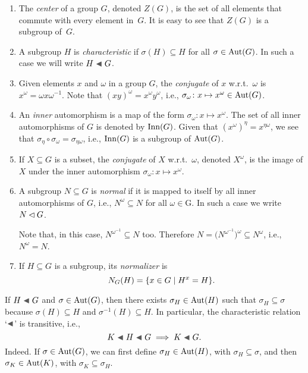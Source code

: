 \begin{defns}${}$
    \begin{enumerate}[\rm i)]
        \item     The \textsl{center} of a group $G$, denoted $Z(G)$, is the set of all elements that commute with every element in~$G$. It is easy to see that $Z(G)$ is a subgroup of~$G$.

        \item A subgroup $H$ is \textsl{characteristic} if $\sigma(H)\subseteq H$ for all $\sigma\in{\rm Aut}(G)$. In such a case we will write $H \ch G$.
        
        \item Given elements $x$ and\/ $\omega$ in a group $G$, the \textsl{conjugate} of $x$ w.r.t.\ $\omega$ is $x^\omega=\omega x\omega^{-1}$. Note that $(xy)^\omega=x^\omega y^\omega$, i.e., $\sigma_\omega\colon x\mapsto x^\omega\in{\rm Aut}(G)$.

        \item An \textsl{inner} automorphism is a map of the form $\sigma_\omega\colon x\mapsto x^\omega$. The set of all inner automorphisms of\/ $G$ is denoted by\/ ${\rm Inn}(G)$. Given that $(x^\omega)^\eta=x^{\eta\omega}$, we see that\/ $\sigma_\eta\circ\sigma_\omega=\sigma_{\eta\omega}$, i.e., ${\rm Inn}(G)$ is a subgroup of ${\rm Aut}(G)$.

        \item If $X\subseteq G$ is a subset, the \textsl{conjugate} of\/ $X$ w.r.t.\ $\omega$, denoted $X^\omega$, is the image of\/ $X$ under the inner automorphism $\sigma_\omega\colon x\mapsto x^\omega$.

        \item A subgroup $N\subseteq G$ is \textsl{normal} if it is mapped to itself by all inner automorphisms of\/ $G$, i.e., $N^\omega\subseteq N$ for all $\omega\in $G. In such a case we write $N\lhd G$.
        
        Note that, in this case, $N^{\omega^{-1}}\subseteq N$ too. Therefore $N=\big(N^{\omega^{-1}}\big)^\omega\subseteq N^\omega$, i.e., $N^\omega=N$.

        \item If $H\subseteq G$ is a subgroup, its \textsl{normalizer} is
        $$
            N_G(H) = \{x\in G\mid H^x=H\}.
        $$
    \end{enumerate}
\end{defns}

\begin{rem}\label{characteristic-transitivity}
    If\/ $H\ch G$ and\/ $\sigma\in{\rm Aut}(G)$, then there exists\/ $\sigma_H\in{\rm Aut}(H)$ such that\/ $\sigma_H\subseteq\sigma$ because $\sigma(H)\subseteq H$ and\/ $\sigma^{-1}(H)\subseteq H$. In particular, the characteristic relation `$\ch$' is transitive, i.e.,
    $$
        K\ch H\ch G\implies K\ch G.
    $$
    \textrm{\rm Indeed. If $\sigma\in{\rm Aut}(G)$, we can first define $\sigma_H\in{\rm Aut}(H)$, with $\sigma_H\subseteq\sigma$, and then $\sigma_K\in{\rm Aut}(K)$, with $\sigma_K\subseteq\sigma_H$.}
\end{rem}

